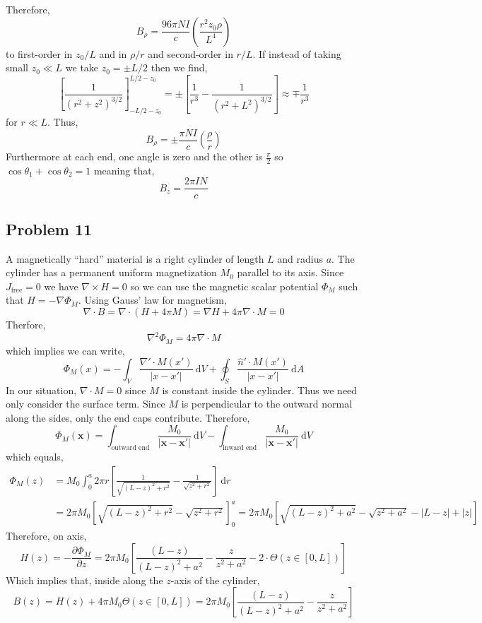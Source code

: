 \documentclass[12pt]{extarticle}
\renewcommand{\d}[1]{\: \mathrm{d}#1}
\newcommand{\pderiv}[2]{\frac{\partial{#1}}{\partial{#2}}}
\renewcommand{\bf}[1]{\mathbf{#1}}
\theoremstyle{definition}
\begin{document}
Therefore,
\[ B_{\rho} = \frac{96 \pi N I}{c} \left( \frac{r^2 z_0 \rho}{L^4} \right) \]
to first-order in $z_0/L$ and in $\rho/r$ and second-order in $r / L$. If instead of taking small $z_0 \ll L$ we take $z_0 = \pm L/2$ then we find,
\[  \left[ \frac{1}{(r^2 + z^2)^{3/2}}  \right]_{-L/2 - z_0}^{L/2 - z_0} = \pm \left[ \frac{1}{r^3} -  \frac{1}{(r^2 + L^2)^{3/2}} \right] \approx \mp \frac{1}{r^3} \]
for $r \ll L$. Thus,
\[ B_{\rho} = \pm \frac{\pi N I}{c} \left( \frac{\rho}{r} \right) \]
Furthermore at each end, one angle is zero and the other is $\frac{\pi}{2}$ so $\cos{\theta_1} + \cos{\theta_2} = 1$ meaning that,
\[ B_z = \frac{2 \pi I N}{c} \]

\subsection{Problem 11}

A magnetically ``hard'' material is a right cylinder of length $L$ and radius $a$. The cylinder has a permanent uniform magnetization $M_0$  parallel to its axis. Since $J_{\text{free}} = 0$ we have $\nabla \times H = 0$ so we can use the magnetic scalar potential $\Phi_M$ such that $H = - \nabla \Phi_M$. Using Gauss' law for magnetism,
\[ \nabla \cdot B = \nabla \cdot (H + 4 \pi M) = \nabla H + 4 \pi \nabla \cdot M = 0 \]
Therfore,
\[ \nabla^2 \Phi_M = 4 \pi \nabla \cdot M \]
which implies we can write,
\[ \Phi_M(x) = - \int_V \frac{\nabla' \cdot M(x')}{|x - x'|} \d{V} + \oint_S \frac{ \hat{n}' \cdot M(x')}{|x - x'|} \d{A} \]
In our situation, $\nabla \cdot M = 0$ since $M$ is constant inside the cylinder. Thus we need only consider the surface term. Since $M$ is perpendicular to the outward normal along the sides, only the end caps contribute. Therefore,
\[ \Phi_M(\bf{x}) = \int_{\text{outward end}} \frac{M_0}{|\bf{x} - \bf{x}'|} \d{V} - \int_{\text{inward end}} \frac{M_0}{|\bf{x} - \bf{x}'|} \d{V} \]
which equals,
\begin{align*}
\Phi_M(z) & = M_0  \int_{0}^a 2 \pi r \left[ \frac{1}{\sqrt{(L - z)^2 + r^2}} - \frac{1}{\sqrt{z^2 + r^2}} \right] \d{r}
\\
& = 2 \pi M_0 \left[ \sqrt{(L - z)^2 + r^2} - \sqrt{z^2 + r^2} \right]_0^a = 2 \pi M_0 \left[ \sqrt{(L - z)^2 + a^2} - \sqrt{z^2 + a^2} - |L - z| + |z| \right] 
\end{align*}
Therefore, on axis,
\[ H(z) = - \pderiv{\Phi_M}{z} = 2 \pi M_0 \left[ \frac{(L - z)}{(L - z)^2 + a^2} - \frac{z}{z^2 + a^2} - 2 \cdot \Theta(z \in [0, L]) \right] \]
Which implies that, inside along the $z$-axis of the cylinder,
\[ B(z) = H(z) + 4 \pi M_0 \Theta(z \in [0, L]) = 2 \pi M_0 \left[ \frac{(L - z)}{(L - z)^2 + a^2} - \frac{z}{z^2 + a^2} \right] \]
\end{document}
